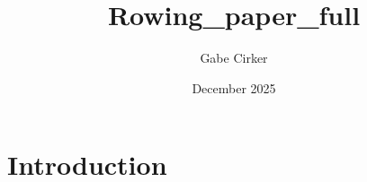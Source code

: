 \documentclass{article}
\title{Rowing_paper_full}
\author{Gabe Cirker}
\date{December 2025}
\begin{document}
\maketitle

\section{Introduction}
\end{document}
